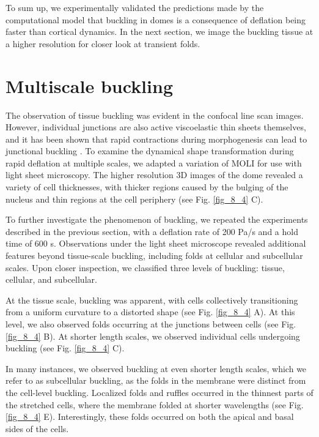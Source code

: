 To sum up, we experimentally validated the predictions made by the computational model that buckling in domes is a consequence of deflation being faster than cortical dynamics. In the next section, we image the buckling tissue at a higher resolution for closer look at transient folds.


\hypertarget{multiscale-buckling}{%
	\section{Multiscale buckling}\label{multiscale-buckling}}

The observation of tissue buckling was evident in the confocal line scan images. However, individual junctions are also active viscoelastic thin sheets themselves, and it has been shown that rapid contractions during morphogenesis can lead to junctional buckling \cite{Sumi:2018aa}. To examine the dynamical shape transformation during rapid deflation at multiple scales, we adapted a variation of MOLI for use with light sheet microscopy. The higher resolution 3D images of the dome revealed a variety of cell thicknesses, with thicker regions caused by the bulging of the nucleus and thin regions at the cell periphery (see Fig. \ref{fig_8_4} C).

To further investigate the phenomenon of buckling, we repeated the experiments described in the previous section, with a deflation rate of 200 Pa/s and a hold time of 600 s. Observations under the light sheet microscope revealed  additional features beyond tissue-scale buckling, including folds at cellular and subcellular scales. Upon closer inspection, we classified three levels of buckling: tissue, cellular, and subcellular.

At the tissue scale, buckling was apparent, with cells collectively transitioning from a uniform curvature to a distorted shape (see Fig. \ref{fig_8_4} A). At this level, we also observed folds occurring at the junctions between cells (see Fig. \ref{fig_8_4} B). At shorter length scales, we observed individual cells undergoing buckling (see Fig. \ref{fig_8_4} C).

In many instances, we observed buckling at even shorter length scales, which we refer to as subcellular buckling, as the folds in the membrane were distinct from the cell-level buckling. Localized folds and ruffles occurred in the thinnest parts of the stretched cells, where the membrane folded at shorter wavelengths (see Fig. \ref{fig_8_4} E). Interestingly, these folds occurred on both the apical and basal sides of the cells.

